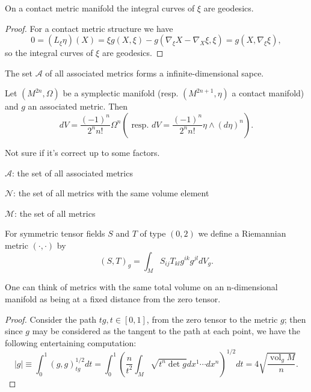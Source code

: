 \begin{theorem}
     On a contact metric manifold the integral curves of $\xi$ are geodesics.
\end{theorem}
\begin{proof}
    For a contact metric structure we have
$$
0=\left(L_{\xi} \eta\right)(X)=\xi g(X, \xi)-g\left(\nabla_{\xi} X-\nabla_X \xi, \xi\right)=g\left(X, \nabla_{\xi} \xi\right),
$$
so the integral curves of $\xi$ are geodesics.
\end{proof}


\begin{remark}
    The set $\mathcal{A}$ of all associated metrics forms a infinite-dimensional sapce.
\end{remark}

\begin{theorem}
     Let $\left(M^{2 n}, \Omega\right)$ be a symplectic manifold (resp. $\left(M^{2 n+1}, \eta\right)$ a contact manifold) and $g$ an associated metric. Then
     \begin{equation}
     d V=\frac{(-1)^n}{2^n n !} \Omega^n\left(\text { resp. } d V=\frac{(-1)^n}{2^n n !} \eta \wedge(d \eta)^n\right).
     \end{equation}
\end{theorem}
\begin{remark}
    Not sure if it's correct up to some factors.
\end{remark}

\begin{definition}
    $\mathcal{A}$: the set of all associated metrics
    
    $\mathcal{N}$: the set of all metrics with the same volume element
    
    $\mathcal{M}$: the set of all metrics
\end{definition}
\begin{definition}
    For symmetric tensor fields $S$ and $T$ of type $(0,2)$ we define a Riemannian metric $(\cdot, \cdot)$ by
    \begin{equation}
        (S, T)_g=\int_M S_{i j} T_{k l} g^{i k} g^{j l} d V_g.
    \end{equation}
\end{definition}
\begin{remark}
    One can think of metrics with the same total volume on an n-dimensional manifold as being at a fixed distance from the zero tensor.
\end{remark}
\begin{proof}
    Consider the path $t g, t \in[0,1]$, from the zero tensor to the metric $g$; then since $g$ may be considered as the tangent to the path at each point, we have the following entertaining computation:
$$
|g| \equiv \int_0^1(g, g)_{t g}^{1 / 2} d t=\int_0^1\left(\frac{n}{t^2} \int_M \sqrt{t^n \operatorname{det} g} d x^1 \cdots d x^n\right)^{1 / 2} d t=4 \sqrt{\frac{\operatorname{vol}_g M}{n}}.
$$
\end{proof}


